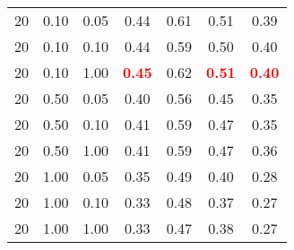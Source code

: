 \begin{tabular}{lllcccc}
20 & 0.10 & 0.05 & 0.44 & 0.61 & 0.51 & 0.39 \\ 
20 & 0.10 & 0.10 & 0.44 & 0.59 & 0.50 & 0.40 \\ 
20 & 0.10 & 1.00 & \textbf{\textcolor{red}{0.45}} & 0.62 & \textbf{\textcolor{red}{0.51}} & \textbf{\textcolor{red}{0.40}} \\ 
20 & 0.50 & 0.05 & 0.40 & 0.56 & 0.45 & 0.35 \\ 
20 & 0.50 & 0.10 & 0.41 & 0.59 & 0.47 & 0.35 \\ 
20 & 0.50 & 1.00 & 0.41 & 0.59 & 0.47 & 0.36 \\ 
20 & 1.00 & 0.05 & 0.35 & 0.49 & 0.40 & 0.28 \\ 
20 & 1.00 & 0.10 & 0.33 & 0.48 & 0.37 & 0.27 \\ 
20 & 1.00 & 1.00 & 0.33 & 0.47 & 0.38 & 0.27 \\ 
\end{tabular} 

